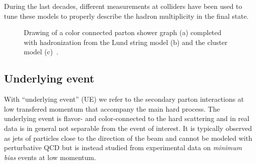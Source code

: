 During the last decades, different measurements at colliders have
been used to tune these models to properly describe 
the hadron multiplicity in the final state.


\begin{figure}[hbt]\begin{center}
	\caption{Drawing of a color connected parton shower graph (a) completed with hadronization from the Lund string model (b) and the cluster model (c)~\cite{Mangano:933464}.}
\end{center}\end{figure}



\subsection{Underlying event}\label{sec:underlyingevent}

With ``underlying event'' (UE) we refer to the secondary parton interactions 
at low transfered momentum that accompany the main hard process. 
The underlying event is flavor- and color-connected to the hard scattering
and in real data is in general not separable from the event of interest.
It is typically observed as jets of particles close to the direction
of the beam and cannot be modeled with perturbative QCD but is instead
studied from experimental data on {\it minimum bias} events at low
momentum.

